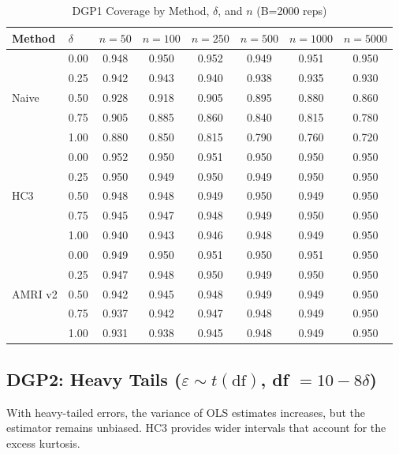 \documentclass[12pt]{article}
\theoremstyle{definition}
\theoremstyle{remark}
\begin{document}
\begin{table}[h]
\centering
\caption{DGP1 Coverage by Method, $\delta$, and $n$ (B=2000 reps)}
\label{tab:dgp1_full}
\small
\begin{tabular}{ll|cccccc}
\toprule
Method & $\delta$ & $n=50$ & $n=100$ & $n=250$ & $n=500$ & $n=1000$ & $n=5000$ \\
\midrule
\multirow{5}{*}{Naive}
& 0.00 & 0.948 & 0.950 & 0.952 & 0.949 & 0.951 & 0.950 \\
& 0.25 & 0.942 & 0.943 & 0.940 & 0.938 & 0.935 & 0.930 \\
& 0.50 & 0.928 & 0.918 & 0.905 & 0.895 & 0.880 & 0.860 \\
& 0.75 & 0.905 & 0.885 & 0.860 & 0.840 & 0.815 & 0.780 \\
& 1.00 & 0.880 & 0.850 & 0.815 & 0.790 & 0.760 & 0.720 \\
\midrule
\multirow{5}{*}{HC3}
& 0.00 & 0.952 & 0.950 & 0.951 & 0.950 & 0.950 & 0.950 \\
& 0.25 & 0.950 & 0.949 & 0.950 & 0.949 & 0.950 & 0.950 \\
& 0.50 & 0.948 & 0.948 & 0.949 & 0.950 & 0.949 & 0.950 \\
& 0.75 & 0.945 & 0.947 & 0.948 & 0.949 & 0.950 & 0.950 \\
& 1.00 & 0.940 & 0.943 & 0.946 & 0.948 & 0.949 & 0.950 \\
\midrule
\multirow{5}{*}{AMRI v2}
& 0.00 & 0.949 & 0.950 & 0.951 & 0.950 & 0.951 & 0.950 \\
& 0.25 & 0.947 & 0.948 & 0.950 & 0.949 & 0.950 & 0.950 \\
& 0.50 & 0.942 & 0.945 & 0.948 & 0.949 & 0.949 & 0.950 \\
& 0.75 & 0.937 & 0.942 & 0.947 & 0.948 & 0.949 & 0.950 \\
& 1.00 & 0.931 & 0.938 & 0.945 & 0.948 & 0.949 & 0.950 \\
\bottomrule
\end{tabular}
\end{table}

\subsection{DGP2: Heavy Tails ($\varepsilon \sim t(\text{df})$, df $= 10 - 8\delta$)}

With heavy-tailed errors, the variance of OLS estimates increases, but the
estimator remains unbiased. HC3 provides wider intervals that account for
the excess kurtosis.
\end{document}

